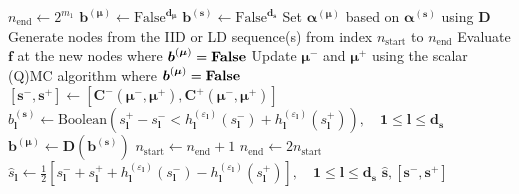 \documentclass[graybox]{svmult}
\begin{document}
\begin{algorithm}[t]
\begin{algorithmic}
    \State $n_\text{end} \gets 2^{m_1}$ 
    \State $\boldsymbol{b}^{(\boldsymbol{\mu})} \gets \text{False}^{\boldsymbol{d}_{\boldsymbol{\mu}}}$ 
    \State $\boldsymbol{b}^{(\boldsymbol{s})} \gets \text{False}^{\boldsymbol{d}_{\boldsymbol{s}}}$ 
    \State Set $\boldsymbol{\alpha}^{(\boldsymbol{\mu})}$ based on $\boldsymbol{\alpha}^{(\boldsymbol{s})}$ using $\boldsymbol{D}$ 
     
        \State Generate nodes from the IID or LD sequence(s) from index $n_\text{start}$ to $n_\text{end}$
        \State Evaluate $\boldsymbol{f}$ at the new nodes where $\boldsymbol{b}^{(\boldsymbol{\mu})}=\textbf{\text{False}}$ 
        \State Update $\boldsymbol{\mu}^-$ and $\boldsymbol{\mu}^+$ using the scalar (Q)MC algorithm where $\boldsymbol{b}^{(\boldsymbol{\mu})}=\textbf{\text{False}}$
        \State $[\boldsymbol{s}^-,\boldsymbol{s}^+] \gets \left[\boldsymbol{C}^-(\boldsymbol{\mu}^-,\boldsymbol{\mu}^+),\boldsymbol{C}^+(\boldsymbol{\mu}^-,\boldsymbol{\mu}^+)\right]$ 
        \State $b^{(\boldsymbol{s})}_{\boldsymbol{l}} \gets \text{Boolean}\left(s_{\boldsymbol{l}}^+-s_{\boldsymbol{l}}^- < h^{(\varepsilon_{\boldsymbol{l}})}_{\boldsymbol{l}}(s_{\boldsymbol{l}}^-)+h^{(\varepsilon_{\boldsymbol{l}})}_{\boldsymbol{l}}(s_{\boldsymbol{l}}^+)\right),\quad \boldsymbol{1} \leq \boldsymbol{l} \leq \boldsymbol{d}_{\boldsymbol{s}}$ 
        \State $\boldsymbol{b}^{(\boldsymbol{\mu})} \gets \boldsymbol{D}\left(\boldsymbol{b}^{(\boldsymbol{s})}\right)$
        \State $n_\text{start} \gets n_\text{end}+1$
        \State $n_\text{end} \gets 2n_\text{start}$
    \EndWhile
    \State $\hat{s}_{\boldsymbol{l}} \gets \frac{1}{2}[s_{\boldsymbol{l}}^-+s_{\boldsymbol{l}}^++h^{(\varepsilon_{\boldsymbol{l}})}_{\boldsymbol{l}}(s_{\boldsymbol{l}}^-)-h^{(\varepsilon_{\boldsymbol{l}})}_{\boldsymbol{l}}(s_{\boldsymbol{l}}^+)], \quad\boldsymbol{1} \leq \boldsymbol{l} \leq \boldsymbol{d}_{\boldsymbol{s}}$ 
    \State \Return $\hat{\boldsymbol{s}},[\boldsymbol{s}^-,\boldsymbol{s}^+]$
    \end{algorithmic}
\end{algorithm}
\end{document}
